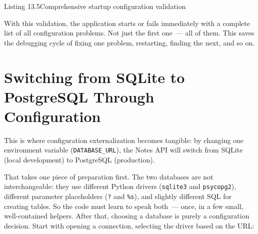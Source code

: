 \begin{codeboxcap}{\textcolor{accent}{Listing 13.5}\enspace Comprehensive startup configuration validation}
\begin{Shaded}
\begin{Highlighting}[]

\OperatorTok{=}
\end{Highlighting}
\end{Shaded}

\end{codeboxcap}

\noindent{}With this validation, the application starts or fails immediately with a complete list of all configuration problems. Not just the first one~--- all of them. This saves the debugging cycle of fixing one problem, restarting, finding the next, and so on.

\setcounter{section}{4}
\section{Switching from SQLite to PostgreSQL Through Configuration}\label{13-configuration-externalization:135-switching-from-sqlite-to-postgresql-through-configuration}

This is where configuration externalization becomes tangible: by changing one environment variable (\texttt{DATABASE\_URL}), the Notes API will switch from SQLite (local development) to PostgreSQL (production).

That takes one piece of preparation first. The two databases are not interchangeable: they use different Python drivers (\texttt{sqlite3} and \texttt{psycopg2}), different parameter placeholders (\texttt{?} and \texttt{\%s}), and slightly different SQL for creating tables. So the code must learn to speak both~--- once, in a few small, well-contained helpers. After that, choosing a database is purely a configuration decision. Start with opening a connection, selecting the driver based on the URL:

